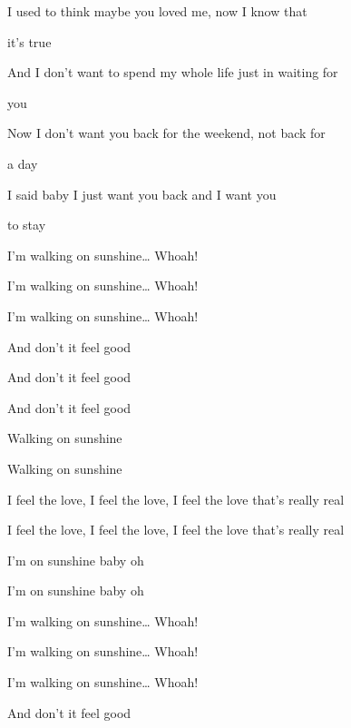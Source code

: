 \begin{song}
I used to think maybe you loved me, now I know that \par
it's true    \par
And I don't want to spend my whole life just in waiting for \par
{}you    \par
Now I don't want you back for the weekend, not back for \par
a day    \par
I said baby I just want you back and I want you \par
to stay    \par

\bigskip

I'm walking on sunshine… Whoah! \par
I'm walking on sunshine… Whoah! \par
I'm walking on sunshine… Whoah! \par
And don't it feel good    \par
And don't it feel good    \par
And don't it feel good    \par

\bigskip

    \par

\bigskip

Walking on sunshine    \par
Walking on sunshine    \par

\bigskip

I feel the love, I feel the love, I feel the love that's really real \par
I feel the love, I feel the love, I feel the love that's really real \par

\bigskip

I'm on sunshine baby oh  \par
I'm on sunshine baby oh  \par

\bigskip

I'm walking on sunshine… Whoah! \par
I'm walking on sunshine… Whoah! \par
I'm walking on sunshine… Whoah! \par
And don't it feel good \par

\end{song}
